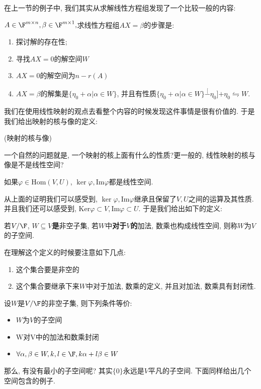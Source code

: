 在上一节的例子中, 我们其实从求解线性方程组发现了一个比较一般的内容: 
\begin{example}
\label{eg:linear-eqs-system}$A\in\F^{m\times n},\beta\in\F^{m\times1},$求线性方程组$AX=\beta$的步骤是:
\begin{enumerate}
\item 探讨解的存在性;
\item 寻找$AX=0$的解空间$W$
\item $AX=0$的解空间为$n-r(A)$
\item $AX=\beta$的解集是$\{\eta_{0}+\alpha|\alpha\in W\}$, 并且有性质$\{\eta_{0}+\alpha|\alpha\in W\}\stackrel[-\eta_{0}]{+\eta_{0}}{\leftrightharpoons}W$.
\end{enumerate}
我们在使用线性映射的观点去看整个内容的时候发现这件事情是很有价值的. 于是我们给出映射的核与像的定义: 
\end{example}
\begin{defn}
(映射的核与像)
\end{defn}
一个自然的问题就是, 一个映射的核上面有什么的性质?更一般的, 线性映射的核与像是不是线性空间? 
\begin{lem}
如果$\varphi\in\text{Hom}(V,U)$, $\ker\varphi,\text{Im}\varphi$都是线性空间. 
\end{lem}
从上面的证明我们可以感受到, $\ker\varphi,\text{Im}\varphi$继承且保留了$V,U$之间的运算及其性质.
并且我们还可以感受到, $\text{Ker}\varphi\subset V,\text{Im}\varphi\subset U$.
于是我们给出如下的定义: 
\begin{defn}
若$V/\F$, \textbf{$W\subseteq V$是}非空子集, 若$W$中\textbf{对于$V$的}加法,
数乘也构成线性空间, 则称$W$为$V$的子空间. 
\end{defn}
在理解这个定义的时候要注意如下几点: 
\begin{enumerate}
\item 这个集合要是非空的
\item 这个集合要继承下来$W$中对于加法, 数乘的定义, 并且对加法, 数乘具有封闭性. 
\end{enumerate}
\begin{prop}
设$W$是$V/\F$的非空子集, 则下列条件等价:
\begin{itemize}
\item $W$为$V$的子空间
\item W对V中的加法和数乘封闭
\item $\forall\alpha,\beta\in W,k,l\in\F,k\alpha+l\beta\in W$
\end{itemize}
\end{prop}
那么, 有没有最小的子空间呢? 其实$\{0\}$永远是$V$平凡的子空间. 下面同样给出几个空间包含的例子. 
